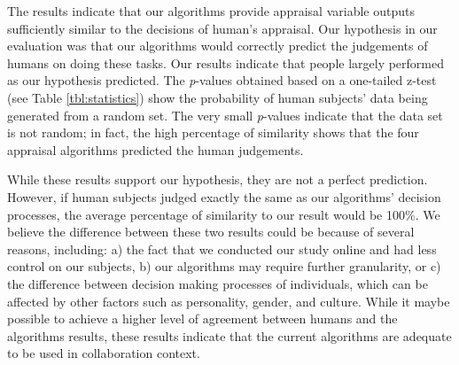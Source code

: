 \documentclass{aamas2016}
\begin{document}
The results indicate that our algorithms provide appraisal variable outputs
sufficiently similar to the decisions of human's appraisal. Our hypothesis in
our evaluation was that our algorithms would correctly predict the judgements of
humans on doing these tasks. Our results indicate that people largely performed
as our hypothesis predicted. The \textit{p}-values obtained based on a
one-tailed z-test (see Table \ref{tbl:statistics}) show the probability of human
subjects' data being generated from a random set. The very small
\textit{p}-values indicate that the data set is not random; in fact, the high
percentage of similarity shows that the four appraisal algorithms predicted the
human judgements.

While these results support our hypothesis, they are not a perfect prediction.
However, if human subjects judged exactly the same as our algorithms' decision
processes, the average percentage of similarity to our result would be 100\%. We
believe the difference between these two results could be because of several
reasons, including: a) the fact that we conducted our study online and had less
control on our subjects, b) our algorithms may require further granularity, or
c) the difference between decision making processes of individuals, which can be
affected by other factors such as personality, gender, and culture. While it
maybe possible to achieve a higher level of agreement between humans and the
algorithms results, these results indicate that the current algorithms are
adequate to be used in collaboration context.








\end{document}
